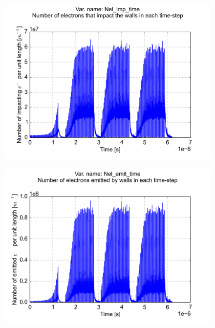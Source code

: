\documentclass[a4paper,12pt]{article}
\begin{document}
\begin{figure}[p]
\begin{center}
\includegraphics[trim = 0 0 0 0, clip, width=.95\textwidth]{../../example/fig03.png}
\end{center}
\end{figure}

\begin{figure}[p]
\begin{center}
\includegraphics[trim = 0 0 0 0, clip, width=.95\textwidth]{../../example/fig04.png}
\end{center}
\end{figure}
\end{document}
